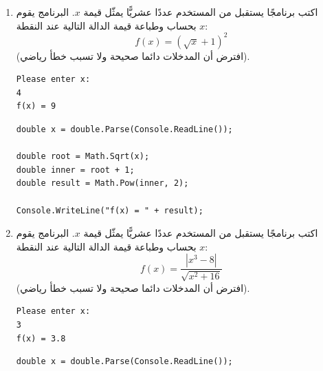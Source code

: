 \documentclass[14pt]{extarticle}
\begin{document}
\begin{enumerate}[itemsep=3em]
\begin{boxSolution}
\begin{english}
\begin{verbatim}
double num = x + 1;
double den = Math.Pow(x, 3);
double result = num / den;

Console.WriteLine("f(x) = " + result);
    \end{verbatim}
    \end{english}
    \end{boxSolution}
    \clearpage
    \fi
    \fi
    \ifwhiteblack
    \clearpage
    \fi

    \item
    اكتب برنامجًا يستقبل من المستخدم عددًا عشريًّا يمثّل قيمة $x$.
    البرنامج يقوم بحساب وطباعة قيمة الدالة التالية عند النقطة $x$:
    $$ f(x) = (\sqrt{x} + 1)^2 $$
    (افترض أن المدخلات دائما صحيحة ولا تسبب خطأ رياضي).
    \ifdetailed
    \begin{boxExample}
    \begin{english}
    \begin{verbatim}
Please enter x:
4
f(x) = 9
    \end{verbatim}
    \end{english}
    \end{boxExample}
    \ifwithsols
    \begin{boxSolution}
    \begin{english}
    \begin{verbatim}
double x = double.Parse(Console.ReadLine());

double root = Math.Sqrt(x);
double inner = root + 1;
double result = Math.Pow(inner, 2);

Console.WriteLine("f(x) = " + result);
    \end{verbatim}
    \end{english}
    \end{boxSolution}
    \fi
    \fi

    \clearpage
    \item
    اكتب برنامجًا يستقبل من المستخدم عددًا عشريًّا يمثّل قيمة $x$.
    البرنامج يقوم بحساب وطباعة قيمة الدالة التالية عند النقطة $x$:
    $$ f(x) = \frac{|x^3 - 8|}{\sqrt{x^2 + 16}} $$
    (افترض أن المدخلات دائما صحيحة ولا تسبب خطأ رياضي).
    \ifdetailed
    \begin{boxExample}
    \begin{english}
    \begin{verbatim}
Please enter x:
3
f(x) = 3.8
    \end{verbatim}
    \end{english}
    \end{boxExample}
    \ifwithsols
    \begin{boxSolution}
    \begin{english}
    \begin{verbatim}
double x = double.Parse(Console.ReadLine());


\end{verbatim}
\end{english}
\end{boxSolution}
\end{enumerate}
\end{document}
